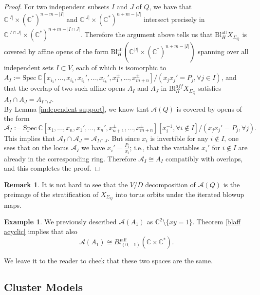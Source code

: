 \documentclass[11pt]{amsart}
\theoremstyle{definition}
\newtheorem{exmp}[thm]{Example}
\newtheorem{rem}[thm]{Remark}
\theoremstyle{remark}
\numberwithin{equation}{section}
\begin{document}
\begin{proof}
   For two independent subsets $I$ and $J$ of $Q$, we have that $\mathbb{C}^{|I|} \times (\mathbb{C}^*)^{n + m - |I|}$ and $\mathbb{C}^{|J|} \times (\mathbb{C}^*)^{n + m - |J|}$ intersect precisely in $\mathbb{C}^{|I \cap J|} \times (\mathbb{C}^*)^{n + m - |I \cap J|}$. Therefore the argument above tells us that $\mathrm{Bl}_H^{\text{aff}} X_{\Sigma_Q}$ is covered by affine opens of the form $\mathrm{Bl}_H^{\text{aff}} (\mathbb{C}^{|I|} \times (\mathbb{C}^*)^{n + m - |I|})$ spanning over all independent sets $I \subset V$, each of which is isomorphic to $A_I:=\text{Spec}\:\mathbb{C}[x_{i_1}, ..., x_{i_k}, x_{i_1}', ..., x_{i_k}', x_{1}^\pm, ..., x_{m+n}^\pm]/(x_j x_j' = P_j, \forall j \in I)$, and that the overlap of two such affine opens $A_I$ and $A_J$ in $\mathrm{Bl}_H^{aff} X_{\Sigma_Q}$ satisfies $A_I \cap A_J = A_{I \cap J}$.\\

   By Lemma \ref{independent support}, we know that $\mathcal{A}(Q)$ is covered by opens of the form $$\mathcal{A}_I :=\text{Spec}\: \mathbb{C}[x_1, ..., x_n, x_1', ..., x_n', x_{n+1}^\pm, ..., x_{m+n}^\pm][x_{i}^{-1},\forall i \notin I]/(x_j x_j' = P_j, \forall j).$$ This implies that $\mathcal{A}_I \cap \mathcal{A}_J = \mathcal{A}_{I \cap J}$. But since $x_i$ is invertible for any $i \notin I$, one sees that on the locus $\mathcal{A}_I$ we have $x_i' = \frac{P_i}{x_i}$; i.e., that the variables $x_i'$ for $i \notin I$ are already in the corresponding ring. Therefore $\mathcal{A}_I \cong A_I$ compatibly with overlaps, and this completes the proof.
\end{proof}

\begin{rem}
    It is not hard to see that
    the $V/D$ decomposition of $\mathcal{A}(Q)$ is the preimage of the stratification of $X_{\Sigma_Q}$ into torus orbits under the iterated blowup maps.
\end{rem}

\begin{exmp}\label{isolated b-side local model}
    We previously described $\mathcal{A}(A_1)$ as $\mathbb{C}^2\setminus\{xy = 1\}$. Theorem \ref{blaff acyclic} implies that also $$\mathcal{A}(A_1) \cong Bl^{\text{aff}}_{(0, -1)} (\mathbb{C} \times \mathbb{C}^*).$$ 
    
    We leave it to the reader to check that these two spaces are the same.
\end{exmp}

\subsection{Cluster Models}
\end{document}
